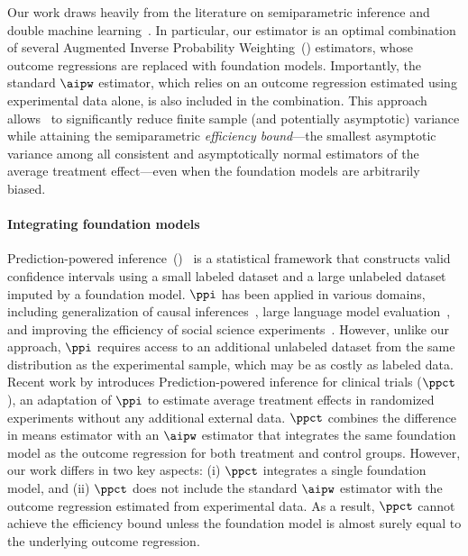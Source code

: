 Our work draws heavily from the literature on semiparametric inference and double machine learning~\citep{robins1994estimation,robins1995semiparametric,tsiatis2006semiparametric,chernozhukov2018double}. In particular, our estimator is an optimal combination of several Augmented Inverse Probability Weighting~(\aipw) estimators, whose outcome regressions are replaced with foundation models. Importantly, the standard $\aipw$ estimator, which relies on an outcome regression estimated using experimental data alone, is also included in the combination. This approach allows \ours~to significantly reduce finite sample (and potentially asymptotic) variance while attaining the semiparametric \emph{efficiency bound}---the smallest asymptotic variance among all consistent and asymptotically normal estimators of the average treatment effect---even when the foundation models are arbitrarily biased.


\paragraph{Integrating foundation models}
Prediction-powered inference~(\ppi)~\citep{angelopoulos2023prediction} is a statistical framework that constructs valid confidence intervals using a small labeled dataset and a large unlabeled dataset imputed by a foundation model. $\ppi$ has been applied in various domains, including generalization of causal inferences~\citep{demirel24prediction}, large language model evaluation~\citep{fisch2024stratified,dorner2024limitsscalableevaluationfrontier}, and improving the efficiency of social science experiments~\citep{broskamixed,egami2024using}. However, unlike our approach, $\ppi$ requires access to an additional unlabeled dataset from the same distribution as the experimental sample, which may be as costly as labeled data. Recent work by \citet{poulet2025prediction} introduces 
Prediction-powered inference for clinical trials ($\ppct$), an adaptation of $\ppi$ to estimate  average treatment effects in randomized experiments without any additional  external data. $\ppct$ combines the difference in means estimator with an 
$\aipw$ estimator that integrates the same foundation model as the outcome regression for both treatment and control groups. However, our work differs in two key aspects:
(i) $\ppct$ integrates a single foundation model, and (ii) $\ppct$ does not include the standard $\aipw$ estimator with the outcome regression estimated from experimental data. As a result, $\ppct$ cannot achieve the efficiency bound unless the foundation model is almost surely equal to the underlying outcome regression. 


